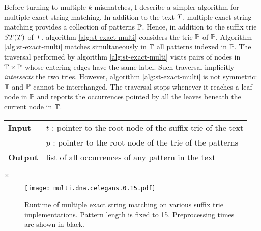 Before turning to multiple $k$-mismatches, I describe a simpler algorithm for multiple exact string matching.
In addition to the text $T$, multiple exact string matching provides a collection of patterns $\mathbb{P}$.
Hence, in addition to the suffix trie $ST(T)$ of $T$, algorithm \ref{alg:st-exact-multi} considers the trie $\mathbb{P}$ of $\mathbb{P}$.
Algorithm \ref{alg:st-exact-multi} matches simultaneously in $\mathbb{T}$ all patterns indexed in $\mathbb{P}$.
The traversal performed by algorithm \ref{alg:st-exact-multi} visits pairs of nodes in $\mathbb{T} \times \mathbb{P}$ whose entering edges have the same label.
Such traversal implicitly \emph{intersects} the two tries.
However, algorithm \ref{alg:st-exact-multi} is not symmetric: $\mathbb{T}$ and $\mathbb{P}$ cannot be interchanged.
The traversal stops whenever it reaches a leaf node in $\mathbb{P}$ and reports the occurrences pointed by all the leaves beneath the current node in $\mathbb{T}$.

\begin{figure*}[t]
\begin{center}
\begin{minipage}[t]{.8\textwidth}
\begin{algorithm}[H]
\begin{tabular}{ll}
\textbf{Input}  & $t$ : pointer to the root node of the suffix trie of the text\\
 			    & $p$ : pointer to the root node of the trie of the patterns\\
\textbf{Output} & list of all occurrences of any pattern in the text\\
\end{tabular}
\begin{algorithmic}[1]
	\State \Report {} $\times$ 
\Else
	\State {}
	\Repeat
			\State {}
			\State {}
		\EndIf
\EndIf
\end{algorithmic}
\label{alg:st-exact-multi}
\end{algorithm}
\end{minipage}
\end{center}
\end{figure*}

\begin{figure}[b]
\begin{center}
\caption[Multiple exact string matching runtime]{Runtime of multiple exact string matching on various suffix trie implementations. Pattern length is fixed to 15. Preprocessing times are shown in black.}
\label{fig:query-dna-exact-multi}
\texttt{[image: multi.dna.celegans.0.15.pdf]}
\end{center}
\end{figure}

